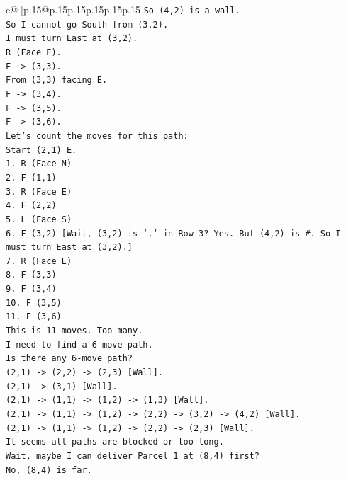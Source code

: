 \documentclass{article}
\begin{document}
{\begin{supertabular}{c@{$\;$}|p{.15\linewidth}@{}p{.15\linewidth}p{.15\linewidth}p{.15\linewidth}p{.15\linewidth}p{.15\linewidth}}
{{{\texttt{So (4,2) is a wall.} \\
\texttt{So I cannot go South from (3,2).} \\
\texttt{I must turn East at (3,2).} \\
\texttt{R (Face E).} \\
\texttt{F {-}> (3,3).} \\
\texttt{From (3,3) facing E.} \\
\texttt{F {-}> (3,4).} \\
\texttt{F {-}> (3,5).} \\
\texttt{F {-}> (3,6).} \\
\texttt{Let's count the moves for this path:} \\
\texttt{Start (2,1) E.} \\
\texttt{1. R (Face N)} \\
\texttt{2. F (1,1)} \\
\texttt{3. R (Face E)} \\
\texttt{4. F (2,2)} \\
\texttt{5. L (Face S)} \\
\texttt{6. F (3,2) {[}Wait, (3,2) is `.` in Row 3? Yes. But (4,2) is \#. So I must turn East at (3,2).{]}} \\
\texttt{7. R (Face E)} \\
\texttt{8. F (3,3)} \\
\texttt{9. F (3,4)} \\
\texttt{10. F (3,5)} \\
\texttt{11. F (3,6)} \\
\texttt{This is 11 moves. Too many.} \\
\texttt{I need to find a 6{-}move path.} \\
\texttt{Is there any 6{-}move path?} \\
\texttt{(2,1) {-}> (2,2) {-}> (2,3) {[}Wall{]}.} \\
\texttt{(2,1) {-}> (3,1) {[}Wall{]}.} \\
\texttt{(2,1) {-}> (1,1) {-}> (1,2) {-}> (1,3) {[}Wall{]}.} \\
\texttt{(2,1) {-}> (1,1) {-}> (1,2) {-}> (2,2) {-}> (3,2) {-}> (4,2) {[}Wall{]}.} \\
\texttt{(2,1) {-}> (1,1) {-}> (1,2) {-}> (2,2) {-}> (2,3) {[}Wall{]}.} \\
\texttt{It seems all paths are blocked or too long.} \\
\texttt{Wait, maybe I can deliver Parcel 1 at (8,4) first?} \\
\texttt{No, (8,4) is far.} \\
}}}
\end{supertabular}}
\end{document}
